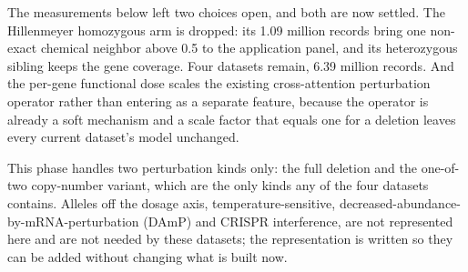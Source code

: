 The measurements below left two choices open, and both are now settled. The Hillenmeyer
homozygous arm is dropped: its 1.09 million records bring one non-exact chemical neighbor
above 0.5 to the application panel, and its heterozygous sibling keeps the gene coverage. Four
datasets remain, 6.39 million records. And the per-gene functional dose scales the existing
cross-attention perturbation operator rather than entering as a separate feature, because
the operator is already a soft mechanism and a scale factor that equals one for a deletion
leaves every current dataset's model unchanged.

This phase handles two perturbation kinds only: the full deletion and the one-of-two
copy-number variant, which are the only kinds any of the four datasets contains. Alleles off
the dosage axis, temperature-sensitive, decreased-abundance-by-mRNA-perturbation (DAmP) and
CRISPR interference, are not represented here and are not needed by these datasets; the
representation is written so they can be added without changing what is built now.
